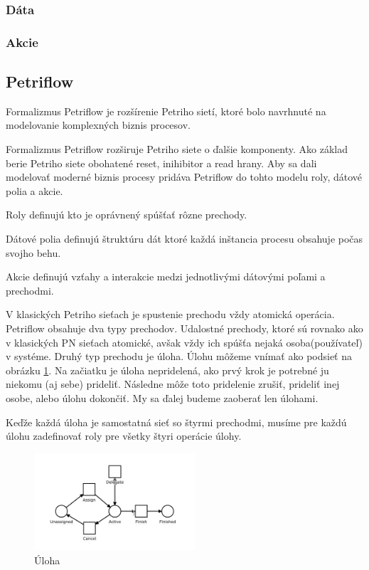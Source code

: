 \subsubsection{Dáta}

\subsubsection{Akcie}

\subsection{Petriflow}

Formalizmus Petriflow je rozšírenie Petriho sietí, ktoré bolo navrhnuté na modelovanie komplexných biznis procesov. 

Formalizmus Petriflow rozširuje Petriho siete o ďalšie komponenty. Ako základ berie Petriho siete obohatené reset, inihibitor a read hrany. Aby sa dali modelovať moderné biznis procesy pridáva Petriflow do tohto modelu roly, dátové polia a akcie.

Roly definujú kto je oprávnený spúšťať rôzne prechody.

Dátové polia definujú štruktúru dát ktoré každá inštancia procesu obsahuje počas svojho behu.

Akcie definujú vzťahy a interakcie medzi jednotlivými dátovými poľami a prechodmi.

V klasických Petriho sieťach je spustenie prechodu vždy atomická operácia. Petriflow obsahuje dva typy prechodov. Udalostné prechody, ktoré sú rovnako  ako v klasických PN sieťach atomické, avšak vždy ich spúšťa nejaká osoba(používateľ) v systéme. Druhý typ prechodu je úloha. Úlohu môžeme vnímať ako podsieť na obrázku \ref{task}. Na začiatku je úloha nepridelená, ako prvý krok je potrebné ju niekomu (aj sebe) prideliť. Následne môže toto pridelenie zrušiť, prideliť inej osobe, alebo úlohu dokončiť. My sa ďalej budeme zaoberať len úlohami.

Keďže každá úloha je samostatná sieť so štyrmi prechodmi, musíme pre každú úlohu zadefinovať roly pre všetky štyri operácie úlohy.

\begin{figure}[!htbp]
\centering
\includegraphics[width=6cm]{img/task_transition.png}
\caption{Úloha}
\label{task}
\end{figure}

